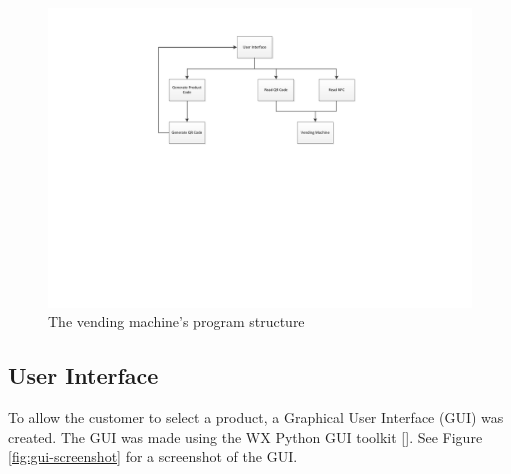 \begin{figure}
 \centering 
 \includegraphics[clip=true, trim = 100 320 0 50,
 scale=0.7]{vending_machine_program_structure}
 \caption{The vending machine's program structure}
 \label{fig:vm_prog_strcture}
\end{figure}

\subsection{User Interface}

To allow the customer to select a product, a Graphical User Interface (GUI) was
created. The GUI was made using the WX Python GUI toolkit
[\cite{website:wx-python}].
See Figure \ref{fig:gui-screenshot} for a screenshot of the
GUI.

